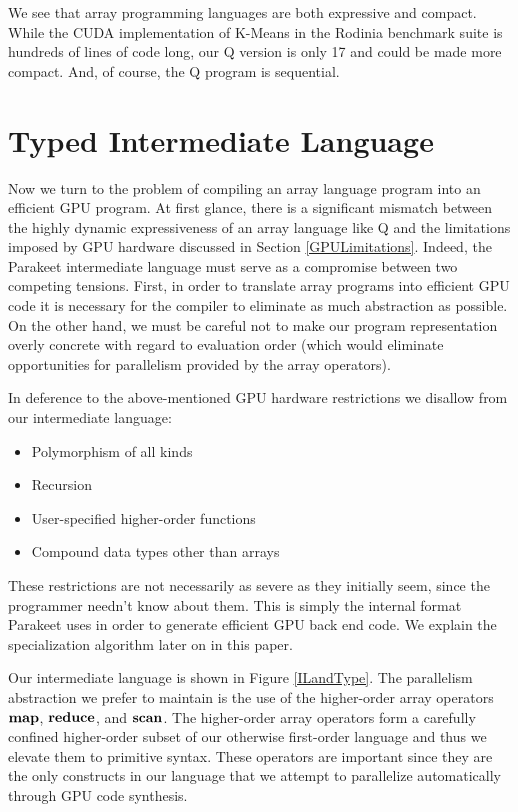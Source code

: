 \documentclass[preprint]{sigplanconf}
\begin{document}
We see that array programming languages are both expressive and compact.  While
the CUDA implementation of K-Means in the Rodinia benchmark suite is hundreds of
lines of code long, our Q version is only 17 and could be 
made more compact.
And, of course, the Q program is sequential.

\section{Typed Intermediate Language}
Now we turn to the problem
of compiling an array language program into an efficient GPU program.
At first glance, there is a significant mismatch between the highly dynamic
expressiveness of an array language like Q and the limitations imposed by GPU
hardware discussed in Section \ref{GPULimitations}. Indeed, the Parakeet
intermediate language must serve as a compromise between two competing tensions.
First, in order to translate array programs into efficient GPU code it is
necessary for the compiler to eliminate as much abstraction as possible. On the
other hand, we must be careful not to make our program representation overly
concrete with regard to evaluation order (which would eliminate opportunities
for parallelism provided by the array operators).

In deference to the above-mentioned GPU hardware restrictions we disallow from
our intermediate language:

\begin{itemize}
\item Polymorphism of all kinds
\item Recursion
\item User-specified higher-order functions
\item Compound data types other than arrays
\end{itemize}

These restrictions are not necessarily as severe as they initially seem, since
the programmer needn't know about them.
This is simply the internal format Parakeet uses in
order to generate efficient GPU back end code. We explain the
specialization algorithm later on in this paper.

Our intermediate language is shown in Figure \ref{ILandType}. The parallelism
abstraction we prefer to maintain is the use of the higher-order array operators
$\mbox{\textbf{map}}$, $\mbox{\textbf{reduce}}$, and $\mbox{\textbf{scan}}$. The higher-order array operators
form a carefully confined higher-order subset of our otherwise first-order
language and thus we elevate them to primitive syntax. These operators are
important since they are the only constructs in our language that we attempt to
parallelize automatically through GPU code synthesis.
\end{document}
